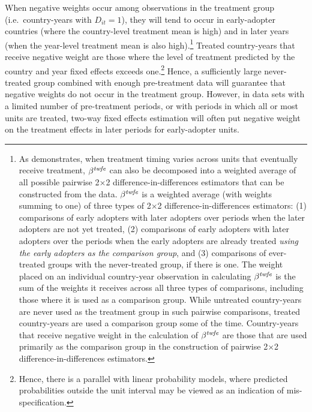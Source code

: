 \documentclass[11pt]{article}
\begin{document}
When negative weights occur among observations in the treatment group (i.e.~country-years with $D_{it}=1$), 
they will tend to occur in early-adopter countries (where the country-level treatment mean is high) and 
in later years (when the year-level treatment mean is also high).\footnote{As  demonstrates, 
when treatment timing varies across units that eventually receive treatment, 
$\beta^{\textit{\scriptsize{twfe}}} $ can also be decomposed into a weighted average of all possible 
pairwise 2$\times$2 difference-in-differences estimators that can be constructed from the data.  $\beta^{\textit{\scriptsize{twfe}}} $ is a weighted average 
(with weights summing to one) of three types of 2$\times$2 difference-in-differences estimators:  
(1) comparisons of early adopters with later adopters over periods when the later adopters are not yet treated, 
(2) comparisons of early adopters with later adopters over the periods when the early adopters are already treated 
\emph{using the early adopters as the comparison group}, and (3) comparisons of ever-treated groups 
with the never-treated group, if there is one.  The weight placed on an individual country-year observation 
in calculating $\beta^{\textit{\scriptsize{twfe}}} $ is the sum of the weights 
it receives across all three types of comparisons, including those where it is used as a comparison group.  
While untreated country-years are never used as the treatment group in such pairwise comparisons, 
treated country-years are used a comparison group some of the time.  Country-years that receive negative weight 
in the calculation of $\beta^{\textit{\scriptsize{twfe}}} $ are those that are used primarily as the comparison group 
in the construction of pairwise 2$\times$2 difference-in-differences estimators.}  
Treated country-years that receive negative weight 
are those where the level of treatment predicted by the country and year fixed effects exceeds one.\footnote{Hence, 
there is a parallel with linear probability models, where predicted probabilities outside the unit interval 
may be viewed as an indication of mis-specification.}  Hence, 
a sufficiently large never-treated group combined with enough pre-treatment data will guarantee that 
negative weights do not occur in the treatment group.  However, in data sets with a limited number of 
pre-treatment periods, or with periods in which all or most units are treated, two-way fixed effects estimation 
will often put negative weight on the treatment effects in later periods for early-adopter units.
\end{document}
